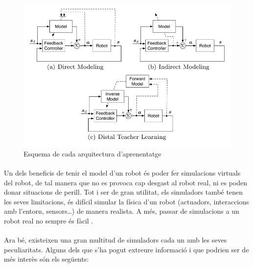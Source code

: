 \documentclass[12pt,a4paper,final,twoside]{article}
\begin{document}
\begin{figure}[tb]
\begin{center}
\includegraphics[scale=0.5]{Imatges/arquitectures-d'aprenentatge.png}
\caption{Esquema de cada arquitectura d'aprenentatge \cite{Nguyen-Tuong2011}\label{fig:esquema-arquitectures-models}}
\end{center}
\end{figure}


\paragraph{}Un dels beneficis de tenir el model d'un robot és poder fer simulacions virtuals del robot, de tal manera que no es provoca cap desgast al robot real, ni es poden donar situacions de perill. Tot i ser de gran utilitat, els simuladors també tenen les seves limitacions, és difícil simular la física d'un robot (actuadors, interaccions amb l'entorn, sensors\dots) de manera realista. A més, passar de simulacions a un robot real no sempre és fàcil \cite{Hohl2006}.

\paragraph{}Ara bé, existeixen una gran multitud de simuladors cada un amb les seves peculiaritats. Alguns dels que s'ha pogut extreure informació i que podrien ser de més interès són els següents:
\end{document}

